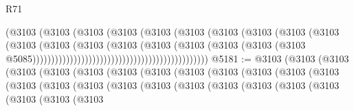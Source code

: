 \begin{lexlean}{R71}
\begin{coremodule}
                                                            (@3103
                                                              (@3103
                                                                (@3103
                                                                  (@3103
                                                                    (@3103
                                                                      (@3103
                                                                        (@3103
                                                                          (@3103
                                                                            (@3103
                                                                              (@3103
                                                                                (@3103
                                                                                  (@3103
                                                                                    (@3103
                                                                                      (@3103
                                                                                        (@3103
                                                                                          (@3103
                                                                                            (@3103
                                                                                              (@3103
                                                                                                (@3103
                                                                                                  @5085)))))))))))))))))))))))))))))))))))))))))))))))
@5181 := @3103
    (@3103
      (@3103
        (@3103
          (@3103
            (@3103
              (@3103
                (@3103
                  (@3103
                    (@3103
                      (@3103
                        (@3103
                          (@3103
                            (@3103
                              (@3103
                                (@3103
                                  (@3103
                                    (@3103
                                      (@3103
                                        (@3103
                                          (@3103
                                            (@3103
                                              (@3103
                                                (@3103
                                                  (@3103
                                                    (@3103

\end{coremodule}
\end{lexlean}
